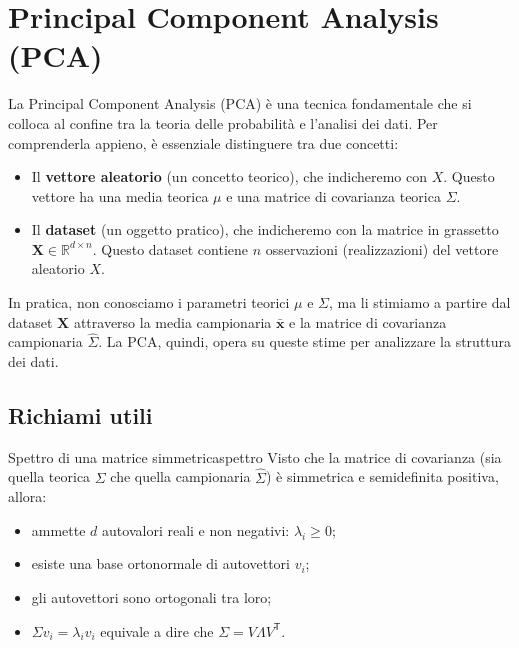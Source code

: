 \section{Principal Component Analysis (PCA)}\label{sec:pca}

La Principal Component Analysis (PCA) è una tecnica fondamentale che si colloca
al confine tra la teoria delle probabilità e l'analisi dei dati. Per
comprenderla appieno, è essenziale distinguere tra due concetti:
\begin{itemize}
    \item Il \textbf{vettore aleatorio} (un concetto teorico), che indicheremo
    con \(X\). Questo vettore ha una media teorica \(\mu\) e una matrice di
    covarianza teorica \(\Sigma\).
    \item Il \textbf{dataset} (un oggetto pratico), che indicheremo con la
    matrice in grassetto \(\mathbf{X} \in \mathbb{R}^{d \times n}\). Questo
    dataset contiene \(n\) osservazioni (realizzazioni) del vettore aleatorio
    \(X\).
\end{itemize}
In pratica, non conosciamo i parametri teorici \(\mu\) e \(\Sigma\), ma li
stimiamo a partire dal dataset \(\mathbf{X}\) attraverso la media campionaria
\(\bar{\mathbf{x}}\) e la matrice di covarianza campionaria \(\hat{\Sigma}\). La
PCA, quindi, opera su queste stime per analizzare la struttura dei dati.

\subsection{Richiami utili}

\begin{nota}{Spettro di una matrice simmetrica}{spettro}
Visto che la matrice di covarianza (sia quella teorica \(\Sigma\) che quella
campionaria \(\hat{\Sigma}\)) è simmetrica e semidefinita positiva, allora:
\begin{itemize}
  \item ammette $d$ autovalori reali e non negativi: \( \lambda_i \geq 0 \);
  \item esiste una base ortonormale di autovettori \( v_i \);
  \item gli autovettori sono ortogonali tra loro;
  \item \( \Sigma v_i = \lambda_i v_i \) equivale a dire che \( \Sigma = V
  \Lambda V^\mathsf{T} \).
\end{itemize}
\end{nota}

